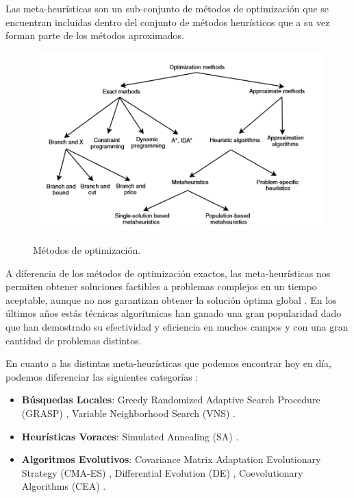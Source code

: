 Las meta-heurísticas son un sub-conjunto de métodos de optimización que se encuentran incluidas dentro del conjunto de métodos heurísticos que a su vez forman parte de los métodos aproximados.

\begin{figure}
  \centering
\includegraphics[scale=1.0]{images/meta}\\[10mm]
  \caption{Métodos de optimización.}
\end{figure}

A diferencia de los métodos de optimización exactos, las meta-heurísticas nos permiten obtener soluciones factibles a problemas complejos en un tiempo aceptable, aunque no nos garantizan obtener la solución óptima global \cite{metaheuristics}. En los últimos años estás técnicas algorítmicas han ganado una gran popularidad dado que han demostrado su efectividad y eficiencia en muchos campos y con una gran cantidad de problemas distintos.

En cuanto a las distintas meta-heurísticas que podemos encontrar hoy en día, podemos diferenciar las siguientes categorías \cite{metaheuristics}:

\begin{itemize}
    \item \textbf{Búsquedas Locales}: Greedy Randomized Adaptive Search Procedure (GRASP) \cite{GRASP}, Variable Neighborhood Search (VNS) \cite{vns}.
    \item \textbf{Heurísticas Voraces}: Simulated Annealing (SA) \cite{SA}.
    \item \textbf{Algoritmos Evolutivos}: Covariance Matrix Adaptation Evolutionary Strategy (CMA-ES) \cite{CMA}, Differential Evolution (DE) \cite{DE1, DE2, DE3}, Coevolutionary Algorithms (CEA) \cite{COE1, COE2, COE3}.
\end{itemize}


